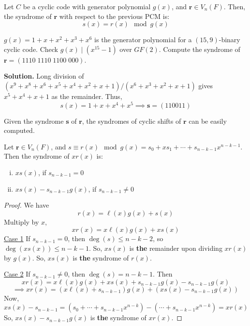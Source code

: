 \begin{thmbox}
    \begin{theorem}
        Let $ C $ be a cyclic code with generator polynomial $ g(x) $, and $ \bm{r}\in V_n(F) $.
        Then, the syndrome of $ \bm{r} $ with respect to the previous PCM is:
        \[ s(x)=r(x)\mod g(x) \]
    \end{theorem}
\end{thmbox}

\begin{exbox}
    \begin{example}
        $ g(x)=1+x+x^2+x^3+x^6 $ is the generator polynomial for a $ (15,9) $-binary cyclic code.
        Check $ g(x)\mid (x^15-1) $ over $ GF(2) $. Compute the syndrome of
        $ \bm{r}=(1110\; 1110\; 1100\; 000) $.

        \textbf{Solution.} Long division of $ (x^9+x^8+x^6+x^5+x^4+x^2+x+1)/(x^6+x^3+x^2+x+1) $
        gives $ x^5+x^4+x+1 $ as the remainder. Thus,
        \[ s(x)=1+x+x^4+x^5\implies \bm{s}=(110011) \]
    \end{example}
\end{exbox}

\begin{remark}
    Given the syndrome $ \bm{s} $ of $ \bm{r} $, the syndromes of cyclic shifts of $ \bm{r} $
    can be easily computed.
\end{remark}

\begin{thmbox}
    \begin{theorem}
        Let $ \bm{r}\in V_n(F) $, and $ s\equiv r(x)\mod g(x)=s_0+xs_1+\cdots+s_{n-k-1}x^{n-k-1} $.
        Then the syndrome of $ xr(x) $ is:
        \begin{enumerate}[(i)]
            \item $ xs(x) $, if $ s_{n-k-1}=0 $
            \item $ xs(x)-s_{n-k-1}g(x) $, if $ s_{n-k-1}\neq 0 $
        \end{enumerate}
    \end{theorem}
\end{thmbox}

\begin{proof}
    We have
    \[ r(x)=\ell (x)g(x)+s(x) \]
    Multiply by $ x $,
    \[ xr(x)=x\ell(x)g(x)+xs(x) \]
    \underline{Case 1} If $ s_{n-k-1}=0 $, then $ \deg(s)\leqslant n-k-2 $,
    so $ \deg(xs(x))\leqslant n-k-1 $. So, $ xs(x) $ is \textbf{the} remainder upon dividing
    $ xr(x) $ by $ g(x) $. So, $ xs(x) $ is \textbf{the} syndrome of $ r(x) $.

    \underline{Case 2} If $ s_{n-k-1}\neq 0 $, then $ \deg(s)=n-k-1 $. Then
    \[ xr(x)=x\ell(x)g(x)+xs(x)+s_{n-k-1}g(x)-s_{n-k-1}g(x) \]
    \[ \implies xr(x)=(x\ell(x)+s_{n-k-1})g(x)+(xs(x)-s_{n-k-1}g(x)) \]
    Now,
    \[ xs(x)-s_{n-k-1}=(s_0+\cdots+s_{n-k-1}x^{n-k})-(\cdots+s_{n-k-1}x^{n-k})=xr(x) \]
    So, $ xs(x)-s_{n-k-1}g(x) $ is \textbf{the} syndrome of $ xr(x) $.
\end{proof}
